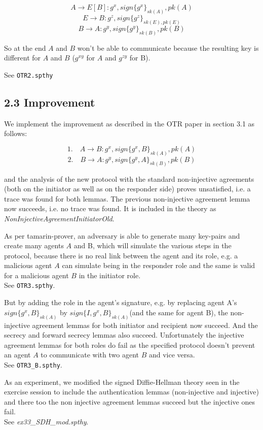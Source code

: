 \documentclass[
]{article}
\begin{document}
\[ A \rightarrow E[B] : g^x, sign\{g^x\}_{sk(A)}, pk(A) \]
\[ E \rightarrow B : g^z, sign\{g^z\}_{sk(E), pk(E)} \]
\[ B \rightarrow A : g^y, sign\{g^y\}_{sk(B)}, pk(B) \]



So at the end $A$ and $B$ won't be able to communicate because the resulting key is different for $A$ and $B$ ($g^{xy}$ for $A$ and $g^{zy}$ for B).

See \texttt{OTR2.spthy}

\newpage
\hypertarget{improvement}{%
\subsection{2.3 Improvement}\label{improvement}}

We implement the improvement as described in the OTR paper in section 3.1 as follows:

\[ \text{1.} \quad A \rightarrow B: g^x, sign\{g^x, B\}_{sk(A)}, pk(A) \]
\[ \text{2.} \quad B \rightarrow A: g^y, sign\{g^y, A\}_{sk(B)}, pk(B) \]

and the analysis of the new protocol with the standard non-injective agreements (both on the initiator as well as on the responder side) proves unsatisfied, i.e. a trace was found for both lemmas. The previous non-injective agreement lemma now succeeds, i.e. no trace was found. It is included in the theory as \emph{NonInjectiveAgreementInitiatorOld}.

As per tamarin-prover, an adversary is able to generate many key-pairs and create many agents $A$ and B, which will simulate the various steps in the protocol, because there is no real link between the agent and its role, e.g. a malicious agent $A$ can simulate being in the responder role and the same is valid for a malicious agent $B$ in the initiator role.\\
See \texttt{OTR3.spthy}.

But by adding the role in the agent's signature, e.g. by replacing agent A's  $sign\{g^x, B\}_{sk(A)}$  by  $sign\{I, g^x, B\}_{sk(A)}$(and the same for agent B), the non-injective agreement lemmas for both initiator and recipient now succeed. And the secrecy and forward secrecy lemmas also succeed. Unfortunately the injective agreement lemmas for both roles do fail as the specified protocol doesn't prevent an agent $A$ to communicate with two agent $B$ and vice versa. \\
See \texttt{OTR3\_B.spthy}.

As an experiment, we modified the signed Diffie-Hellman theory seen in the exercise session to include the authentication lemmas (non-injective and injective) and there too the non injective agreement lemmas succeed but the injective ones fail. \\
See \emph{ex33\_SDH\_mod.spthy}.
\end{document}
